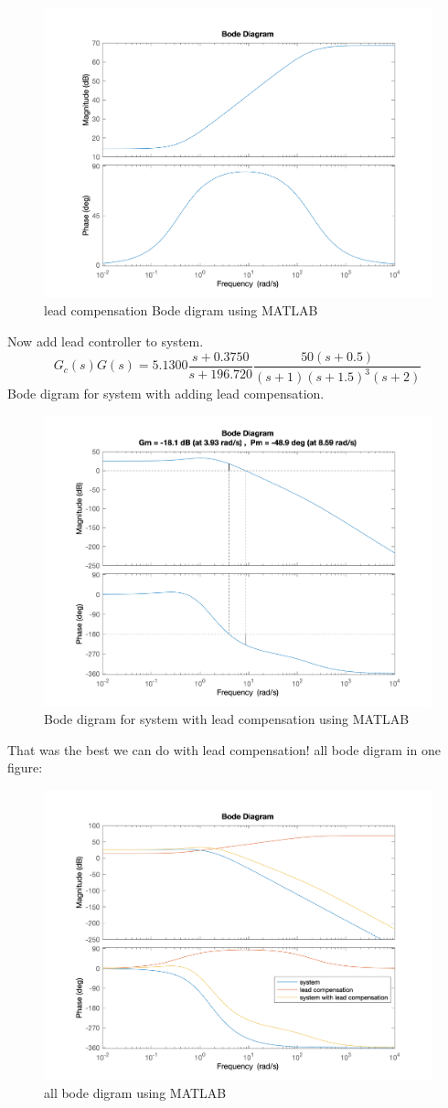 \begin{figure}[H]
	\caption{lead compensation Bode digram using MATLAB}
	\centering
	\includegraphics[width=12cm]{../Figure/Q1/a/controller_bode.png}
\end{figure}
Now add lead controller to system.
$$
G_c(s)G(s) = 5.1300\dfrac{s + 0.3750}{s + 196.720} \dfrac{50(s+0.5)}{(s+1)(s+1.5)^{3}(s+2)}
$$
Bode digram for system with adding lead compensation.
\begin{figure}[H]
	\caption{Bode digram for system with lead compensation using MATLAB}
	\centering
	\includegraphics[width=12cm]{../Figure/Q1/a/new_margin.png}
\end{figure}
That was the best we can do with lead compensation!
all bode digram in one figure:
\begin{figure}[H]
	\caption{all bode digram using MATLAB}
	\centering
	\includegraphics[width=12cm]{../Figure/Q1/a/all_in_one.png}
\end{figure}